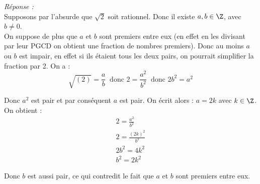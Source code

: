 \textit{Réponse : }\\

Supposons par l'absurde que $\sqrt{2}$ soit rationnel. Donc il existe $a,b \in \Z$, avec $b \neq 0$.\\
On suppose de plus que $a$ et $b$ sont premiers entre eux (en effet en les divisant par leur PGCD on obtient une fraction de nombres premiers). 
Donc au moins $a$ ou $b$ est impair, en effet si ils étaient tous les deux pairs, on pourrait simplifier la fraction par 2.  
On a : 
\[
\sqrt{(2)} = \frac{a}{b} \ \text{ donc } 2 = \frac{a^2}{b^2} \ \text{ donc } 2 b^2 = a^2
\]

Donc $a^2$ est pair et par conséquent $a$ est pair. On écrit alors : $a = 2k$ avec $k \in \Z$.
On obtient : 
\begin{align*}
	2 = \frac{a^2}{b^2} \\
	2 = \frac{(2k)^2}{b^2}\\
	2 b^2 = 4k^2 \\
	b^2 = 2 k^2
\end{align*}

Donc $b$ est aussi pair, ce qui contredit le fait que $a$ et $b$ sont premiers entre eux.